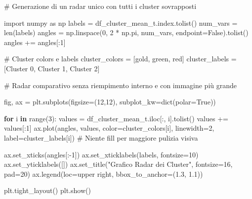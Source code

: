 \documentclass[
  letterpaper,
  DIV=11,
  numbers=noendperiod]{scrartcl}
\newenvironment{Shaded}{\begin{snugshade}}{\end{snugshade}}
\newcommand{\BuiltInTok}[1]{\textcolor[rgb]{0.00,0.23,0.31}{#1}}
\newcommand{\CommentTok}[1]{\textcolor[rgb]{0.37,0.37,0.37}{#1}}
\newcommand{\ControlFlowTok}[1]{\textcolor[rgb]{0.00,0.23,0.31}{\textbf{#1}}}
\newcommand{\DecValTok}[1]{\textcolor[rgb]{0.68,0.00,0.00}{#1}}
\newcommand{\FloatTok}[1]{\textcolor[rgb]{0.68,0.00,0.00}{#1}}
\newcommand{\ImportTok}[1]{\textcolor[rgb]{0.00,0.46,0.62}{#1}}
\newcommand{\KeywordTok}[1]{\textcolor[rgb]{0.00,0.23,0.31}{\textbf{#1}}}
\newcommand{\NormalTok}[1]{\textcolor[rgb]{0.00,0.23,0.31}{#1}}
\newcommand{\OperatorTok}[1]{\textcolor[rgb]{0.37,0.37,0.37}{#1}}
\newcommand{\StringTok}[1]{\textcolor[rgb]{0.13,0.47,0.30}{#1}}
\newcommand{\VariableTok}[1]{\textcolor[rgb]{0.07,0.07,0.07}{#1}}
\begin{document}
\label{fig3}
\begin{Shaded}
\begin{Highlighting}[]
\CommentTok{\# Generazione di un radar unico con tutti i cluster sovrapposti}

\ImportTok{import}\NormalTok{ numpy }\ImportTok{as}\NormalTok{ np}
\NormalTok{labels }\OperatorTok{=}\NormalTok{ df\_cluster\_mean\_t.index.tolist()}
\NormalTok{num\_vars }\OperatorTok{=} \BuiltInTok{len}\NormalTok{(labels)}
\NormalTok{angles }\OperatorTok{=}\NormalTok{ np.linspace(}\DecValTok{0}\NormalTok{, }\DecValTok{2} \OperatorTok{*}\NormalTok{ np.pi, num\_vars, endpoint}\OperatorTok{=}\VariableTok{False}\NormalTok{).tolist()}
\NormalTok{angles }\OperatorTok{+=}\NormalTok{ angles[:}\DecValTok{1}\NormalTok{]}

\CommentTok{\# Cluster colors e labels}
\NormalTok{cluster\_colors }\OperatorTok{=}\NormalTok{ [}\StringTok{\textquotesingle{}gold\textquotesingle{}}\NormalTok{, }\StringTok{\textquotesingle{}green\textquotesingle{}}\NormalTok{, }\StringTok{\textquotesingle{}red\textquotesingle{}}\NormalTok{]}
\NormalTok{cluster\_labels }\OperatorTok{=}\NormalTok{ [}\StringTok{\textquotesingle{}Cluster 0\textquotesingle{}}\NormalTok{, }\StringTok{\textquotesingle{}Cluster 1\textquotesingle{}}\NormalTok{, }\StringTok{\textquotesingle{}Cluster 2\textquotesingle{}}\NormalTok{]}

\CommentTok{\# Radar comparativo senza riempimento interno e con immagine più grande}

\NormalTok{fig, ax }\OperatorTok{=}\NormalTok{ plt.subplots(figsize}\OperatorTok{=}\NormalTok{(}\DecValTok{12}\NormalTok{,}\DecValTok{12}\NormalTok{), subplot\_kw}\OperatorTok{=}\BuiltInTok{dict}\NormalTok{(polar}\OperatorTok{=}\VariableTok{True}\NormalTok{))}

\ControlFlowTok{for}\NormalTok{ i }\KeywordTok{in} \BuiltInTok{range}\NormalTok{(}\DecValTok{3}\NormalTok{):}
\NormalTok{    values }\OperatorTok{=}\NormalTok{ df\_cluster\_mean\_t.iloc[:, i].tolist()}
\NormalTok{    values }\OperatorTok{+=}\NormalTok{ values[:}\DecValTok{1}\NormalTok{]}
\NormalTok{    ax.plot(angles, values, color}\OperatorTok{=}\NormalTok{cluster\_colors[i], linewidth}\OperatorTok{=}\DecValTok{2}\NormalTok{, label}\OperatorTok{=}\NormalTok{cluster\_labels[i])}
    \CommentTok{\# Niente fill per maggiore pulizia visiva}

\NormalTok{ax.set\_xticks(angles[:}\OperatorTok{{-}}\DecValTok{1}\NormalTok{])}
\NormalTok{ax.set\_xticklabels(labels, fontsize}\OperatorTok{=}\DecValTok{10}\NormalTok{)}
\NormalTok{ax.set\_yticklabels([])}
\NormalTok{ax.set\_title(}\StringTok{"Grafico Radar dei Cluster"}\NormalTok{, fontsize}\OperatorTok{=}\DecValTok{16}\NormalTok{, pad}\OperatorTok{=}\DecValTok{20}\NormalTok{)}
\NormalTok{ax.legend(loc}\OperatorTok{=}\StringTok{\textquotesingle{}upper right\textquotesingle{}}\NormalTok{, bbox\_to\_anchor}\OperatorTok{=}\NormalTok{(}\FloatTok{1.3}\NormalTok{, }\FloatTok{1.1}\NormalTok{))}

\NormalTok{plt.tight\_layout()}
\NormalTok{plt.show()}
\end{Highlighting}
\end{Shaded}
\end{document}
